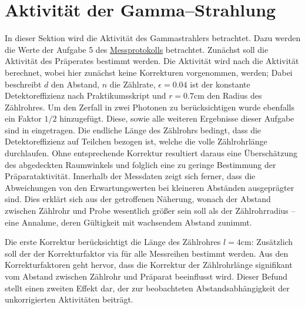 \section{Aktivität der Gamma--Strahlung}
\label{sec:A3}
In dieser Sektion wird die Aktivität des Gammastrahlers betrachtet. Dazu werden die Werte der Aufgabe 5 des \hyperref[ch:Protokoll]{Messprotokolls} betrachtet. 
Zunächst soll die Aktivität des Präperates bestimmt werden. 
Die Aktivität wird nach  die Aktivität berechnet, wobei hier zunächst keine Korrekturen vorgenommen, werden;
Dabei beschreibt $d$ den Abstand, $n$ die Zählrate, $\epsilon = 0.04$ ist der konstante Detektoreffizienz nach Praktikumsskript und $r = 0.7$cm den Radius des Zählrohres.
Um den Zerfall in zwei Photonen zu berücksichtigen wurde ebenfalls ein Faktor $1/2$ hinzugefügt. 
Diese, sowie alle weiteren Ergebnisse dieser Aufgabe sind in  eingetragen.
Die endliche Länge des Zählrohrs bedingt, dass die Detektoreffizienz auf Teilchen bezogen ist, welche die volle Zählrohrlänge durchlaufen. Ohne entsprechende Korrektur resultiert daraus eine Überschätzung des abgedeckten Raumwinkels und folglich eine zu geringe Bestimmung der Präparataktivität.
Innerhalb der Messdaten zeigt sich ferner, dass die Abweichungen von den Erwartungswerten bei kleineren Abständen ausgeprägter sind. Dies erklärt sich aus der getroffenen Näherung, wonach der Abstand zwischen Zählrohr und Probe wesentlich größer sein soll als der Zählrohrradius -- eine Annahme, deren Gültigkeit mit wachsendem Abstand zunimmt.

Die erste Korrektur berücksichtigt die Länge des Zählrohres $l = 4$cm:
Zusätzlich soll der der Korrekturfaktor via 
für alle Messreihen bestimmt werden. 
Aus den Korrekturfaktoren geht hervor, dass die Korrektur der Zählrohrlänge signifikant vom Abstand zwischen Zählrohr und Präparat beeinflusst wird. Dieser Befund stellt einen zweiten Effekt dar, der zur beobachteten Abstandsabhängigkeit der unkorrigierten Aktivitäten beiträgt.

